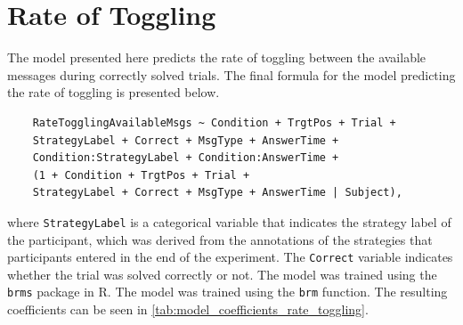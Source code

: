 \section{Rate of Toggling}
\label{sec:rate_toggling}

The model presented here predicts the rate of toggling between the available messages during correctly solved trials. The final formula for the model predicting the rate of toggling is presented below.

\begin{verbatim}
    RateTogglingAvailableMsgs ~ Condition + TrgtPos + Trial +
    StrategyLabel + Correct + MsgType + AnswerTime +
    Condition:StrategyLabel + Condition:AnswerTime +
    (1 + Condition + TrgtPos + Trial +
    StrategyLabel + Correct + MsgType + AnswerTime | Subject),
\end{verbatim}

where \texttt{StrategyLabel} is a categorical variable that indicates the strategy label of the participant, which was derived from the annotations of the strategies that participants entered in the end of the experiment. The \texttt{Correct} variable indicates whether the trial was solved correctly or not. The model was trained using the \texttt{brms} package in R. The model was trained using the \texttt{brm} function. The resulting coefficients can be seen in \autoref{tab:model_coefficients_rate_toggling}.



